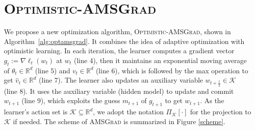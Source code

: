 \documentclass[11pt]{article}
\def\K{\mathcal{K}}
\theoremstyle{k}
\begin{document}
\section{\textsc{Optimistic-AMSGrad}}
We propose a new optimization algorithm,
\textsc{Optimistic-AMSGrad}, shown in Algorithm~\ref{alg:optamsgrad}. It combines the idea of adaptive optimization with optimistic learning. In each iteration, the learner computes a gradient vector $g_{t}:= \nabla \ell_t( w_t)$ at $w_{t}$ (line 4), then it maintains an exponential moving average of $\theta_{t} \in \mathbb R^{d}$ (line 5) and $v_{t} \in \mathbb R^{d}$ (line 6), which is followed by
the max operation to get $\hat{v}_{t} \in \mathbb R^{d}$ (line 7).
The learner also updates an auxiliary variable $w_{t+\frac{1}{2}} \in \K$ (line 8). It uses the auxiliary variable (hidden model) to update and commit $w_{t+1}$ (line 9), which exploits the guess $m_{t+1}$ of $g_{t+1}$ to get $w_{t+1}$.
As the learner's action set is $\K \subseteq \mathbb R^{d}$, we adopt the notation $\Pi_{\K}[\cdot]$ for the projection to $\K$ if needed. The scheme of \textsc{AMSGrad} is summarized in Figure \ref{scheme}.
\end{document}

